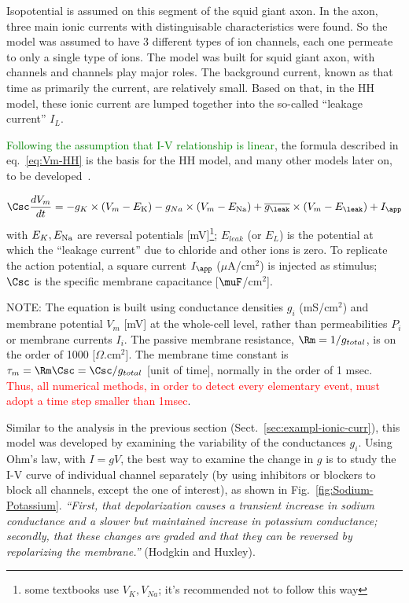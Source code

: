Isopotential is assumed on this segment of the squid giant axon.
In the axon, three main ionic currents with distinguisable characteristics were
found. So the model was assumed to have 3 different types of ion channels, each
one permeate to only a single type of ions. The model was built for squid giant
axon, with  channels and  channels play major roles. The
background current, known as that time as primarily the  current, are
relatively small. Based on that, in the HH model, these ionic current are lumped
together into the so-called ``leakage current'' $I_L$.



\textcolor{green}{Following the assumption that I-V relationship is linear}, the
formula described in eq.~\eqref{eq:Vm-HH} is the basis for the HH model, and
many other models later on, to be developed~\citep{hodgkin1952ap, hodgkin1990qdm}.


\begin{equation}
  \label{eq:Vm-HH}
  \Csc \frac{dV_m}{dt} =  -g_K \times (V_m-E_{\ce{K}})
  -g_{Na} \times (V_m-E_{\ce{Na}})+ \overline{g_{\leak}} \times (V_m-E_{\leak}) + I_\app
\end{equation}
with $E_K, E_{\ce{Na}}$ are reversal potentials
[mV]\footnote{some textbooks use $V_K, V_{Na}$; it's recommended not
  to follow this way};
$E_{leak}$ (or $E_L$) is the potential at which the ``leakage
current'' due to chloride and other ions is zero. To replicate the
action potential, a square current $I_\app$ ($\mu$A/cm$^2$) is injected
as stimulus; $\Csc$ is the specific membrane capacitance [$\muF$/cm$^2$].

\begin{mdframed}
  NOTE: The equation is built using conductance densities $g_i$
  (mS/cm$^2$) and membrane potential $V_m$ [mV] at the whole-cell level, rather
  than permeabilities $P_i$ or membrane currents $I_i$. The passive
  membrane resistance, $\Rm=1/g_{total}$, is on the order of 1000
  [$\Omega$.cm$^2$]. The membrane time constant is
  $\tau_m=\Rm\Csc=\Csc/g_{total}$ [unit of time], normally in the
  order of 1 msec.
  \textcolor{red}{Thus, all numerical methods, in order to detect
    every elementary event, must adopt a time step smaller than
    1msec}.
\end{mdframed}

Similar to the analysis in the previous section
(Sect.~\ref{sec:exampl-ionic-curr}), this model was developed by
examining the variability of the conductances $g_i$. Using Ohm's law,
with $I=gV$, the best way to examine the change in $g$ is to study the
I-V curve of individual channel separately (by using inhibitors or
blockers to block all channels, except the one of interest), as shown
in Fig.~\ref{fig:Sodium-Potassium}.
{\it ``First, that depolarization causes a transient increase in
  sodium conductance and a slower but maintained increase in potassium
  conductance; secondly, that these changes are graded and that they
  can be reversed by repolarizing the membrane.''}
(Hodgkin and Huxley).


